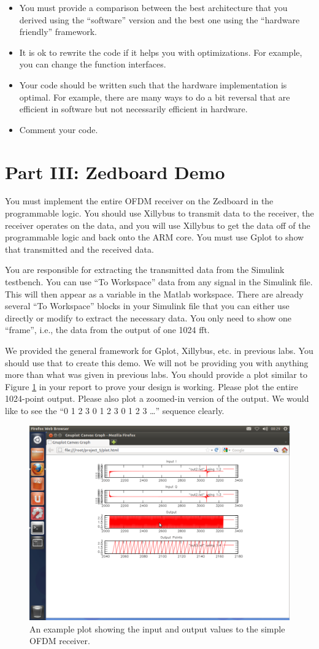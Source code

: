 \begin{itemize}
\item You must provide a comparison between the best architecture that you derived using the ``software'' version and the best one using the ``hardware friendly'' framework.
\item It is ok to rewrite the code if it helps you with optimizations. For example, you can change the function interfaces.
\item Your code should be written such that the hardware implementation is optimal. For example, there are many ways to do a bit reversal that are efficient in software but not necessarily efficient in hardware.
\item Comment your code.
\end{itemize}

\section{Part III: Zedboard Demo}
You must implement the entire OFDM receiver on the Zedboard in the programmable logic. You should use Xillybus to transmit data to the receiver, the receiver operates on the data, and you will use Xillybus to get the data off of the programmable logic and back onto the ARM core. You must use Gplot to show that transmitted and the received data. 

You are responsible for extracting the transmitted data from the Simulink testbench. You can use ``To Workspace'' data from any signal in the Simulink file. This will then appear as a variable in the Matlab workspace. There are already several ``To Workspace'' blocks in your Simulink file that you can either use directly or modify to extract the necessary data. You only need to show one ``frame'', i.e., the data from the output of one 1024 \gls{fft}.

We provided the general framework for Gplot, Xillybus, etc. in previous labs. You should use that to create this demo. We will not be providing you with anything more than what was given in previous labs. You should provide a plot similar to Figure \ref{fig:ofdm_zedboard} in your report to prove your design is working.  Please plot the entire 1024-point output. Please also plot a zoomed-in version of the output. We would like to see the ``0 1 2 3 0 1 2 3 0 1 2 3 \dots'' sequence clearly.

\begin{figure}
\centering
\includegraphics[width=6in]{images/ofdm_zedboard}
\caption{An example plot showing the input and output values to the simple OFDM receiver.}
\label{fig:ofdm_zedboard}
\end{figure}
